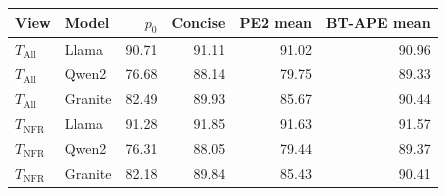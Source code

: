 \begin{tabular}{llrrrr}
\toprule
View & Model & $p_0$ & Concise & PE2 mean & BT-APE mean \\
\midrule
$T_{\mathrm{All}}$ & Llama & 90.71 & 91.11 & 91.02 & 90.96 \\
$T_{\mathrm{All}}$ & Qwen2 & 76.68 & 88.14 & 79.75 & 89.33 \\
$T_{\mathrm{All}}$ & Granite & 82.49 & 89.93 & 85.67 & 90.44 \\
\midrule
$T_{\mathrm{NFR}}$ & Llama & 91.28 & 91.85 & 91.63 & 91.57 \\
$T_{\mathrm{NFR}}$ & Qwen2 & 76.31 & 88.05 & 79.44 & 89.37 \\
$T_{\mathrm{NFR}}$ & Granite & 82.18 & 89.84 & 85.43 & 90.41 \\
\bottomrule
\end{tabular}
